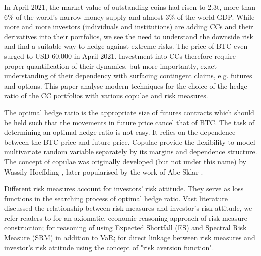 \documentclass[11pt,a4paper,english]{article}
\providecommand{\natp}[1]{\textcolor{darkorange}{#1}}
\begin{document}
In April 2021, the market value of outstanding coins had risen to 2.3t,
more than 6\% of the world's narrow money supply and almost 3\% of the world GDP.
While more and more investors (individuals and institutions) are adding
CCs and their derivatives into their portfolios,  %
we see the need to understand the downside risk and find a suitable way to hedge against extreme risks.
The price of BTC even surged to USD 60,000 in April 2021.
Investment into CCs therefore require proper quantification of their dynamics, but more importantly, exact understanding of their dependency with surfacing contingent claims, e.g. futures and options.
This paper analyse modern techniques for the choice of the hedge ratio of the CC portfolios with various copulae and risk measures. \medskip





The optimal hedge ratio is the appropriate size of futures contracts which should be held such that the movements in future price cancel that of BTC.
The task of determining an optimal hedge ratio is not easy.
It relies on the dependence between the BTC price and future price.
Copulae provide the flexibility to model multivariate random variable
separately by its margins and dependence structure.
The concept of copulae was originally developed (but not under this name) by Wassily Hoeffding \citep{hoeffding1940masstabinvariante}
, later popularised by the work of Abe Sklar \citep{Sklar1959}. \medskip

Different risk measures account for investors' risk attitude.
They serve as loss functions in the searching process of optimal hedge ratio.
Vast literature discussed the relationship between risk measures and investor's risk attitude, we refer readers to
\citet{artzner1999coherent} for an axiomatic, economic reasoning approach of risk measure construction;
\citet{embrechts2002correlation} for reasoning of using Expected Shortfall (ES) and Spectral Risk Measure (SRM) in addition to VaR;
\citet{Acerbi2002} for direct linkage between risk measures and investor's risk attitude using the concept of "risk aversion function". \medskip
\end{document}
